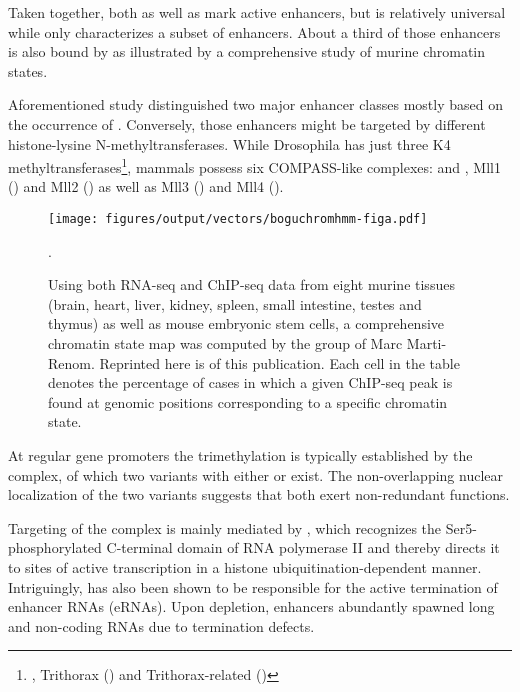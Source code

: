 Taken together, both \hisfourone as well as \hisfourthree mark active enhancers, but \hisfourone is relatively universal while \hisfourthree only characterizes a subset of enhancers. About a third of those \hisfourthree enhancers is also bound by  as illustrated by a comprehensive study of murine chromatin states\cite{Bogu2015}.

Aforementioned study distinguished two major enhancer classes mostly based on the occurrence of \hisfourthree. Conversely, those enhancers might be targeted by different histone-lysine N-methyltransferases. While Drosophila has just three K4 methyltransferases\footnote{ , Trithorax () and Trithorax-related ()}, mammals possess six COMPASS-like complexes:   and , Mll1 () and Mll2 () as well as Mll3 ()  and Mll4 (). 

\begin{figure}[t] 
	\centering
	\texttt{[image: figures/output/vectors/boguchromhmm-figa.pdf]} 
	\caption{Using both RNA-seq and ChIP-seq data from eight murine tissues (brain, heart, liver, kidney, spleen, small intestine, testes and thymus) as well as mouse embryonic stem cells, a comprehensive chromatin state map was computed by the group of Marc Marti-Renom\cite{Bogu2015}. Reprinted here is of this publication. Each cell in the table denotes the percentage of cases in which a given ChIP-seq peak is found at genomic positions corresponding to a specific chromatin state.}
	\label{fig:mouse_chromatin_states}.
\end{figure}

At regular gene promoters the trimethylation is typically established by the  complex, of which two variants with either  or  exist\cite{Lee2007}. The non-overlapping nuclear localization of the two variants suggests that both exert non-redundant functions\cite{Lee2007}.

Targeting of the  complex is mainly mediated by , which recognizes  the Ser5-phosphorylated C-terminal domain of RNA polymerase II\cite{Lee2008} and thereby directs it to sites of active transcription in a histone  ubiquitination-dependent manner\cite{Wu2008a}.  Intriguingly,  has also been shown to be responsible for the active termination of enhancer RNAs (eRNAs).  Upon  depletion, enhancers abundantly spawned long and non-coding RNAs due to termination defects\cite{Austenaa2015}.

